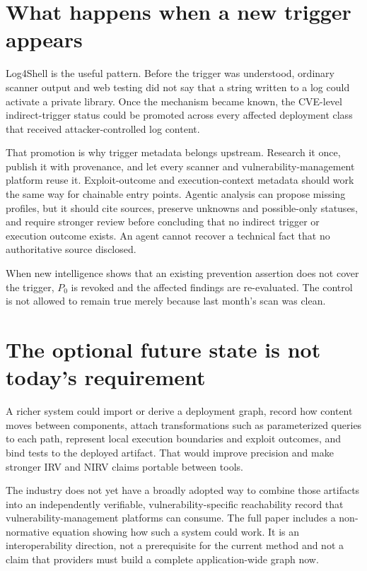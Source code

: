 \documentclass[11pt]{article}
\begin{document}
\section*{What happens when a new trigger appears}
Log4Shell is the useful pattern. Before the trigger was understood, ordinary
scanner output and web testing did not say that a string written to a log could
activate a private library. Once the mechanism became known, the CVE-level
indirect-trigger status could be promoted across every affected deployment
class that received attacker-controlled log content.

That promotion is why trigger metadata belongs upstream. Research it once,
publish it with provenance, and let every scanner and vulnerability-management
platform reuse it. Exploit-outcome and execution-context metadata should work
the same way for chainable entry points. Agentic analysis can propose missing
profiles, but it should cite sources, preserve unknowns and possible-only
statuses, and require stronger review before concluding that no indirect
trigger or execution outcome exists. An agent cannot recover a technical fact
that no authoritative source disclosed.

When new intelligence shows that an existing prevention assertion does not cover
the trigger, $P_0$ is revoked and the affected findings are re-evaluated. The
control is not allowed to remain true merely because last month's scan was clean.

\section*{The optional future state is not today's requirement}
A richer system could import or derive a deployment graph, record how content
moves between components, attach transformations such as parameterized queries
to each path, represent local execution boundaries and exploit outcomes, and
bind tests to the deployed artifact. That would improve precision and make
stronger IRV and NIRV claims portable between tools.

The industry does not yet have a broadly adopted way to combine those artifacts
into an independently verifiable, vulnerability-specific reachability record
that vulnerability-management platforms can consume. The full paper includes a
non-normative equation showing how such a system could work. It is an
interoperability direction, not a prerequisite for the current method and not a
claim that providers must build a complete application-wide graph now.
\end{document}
